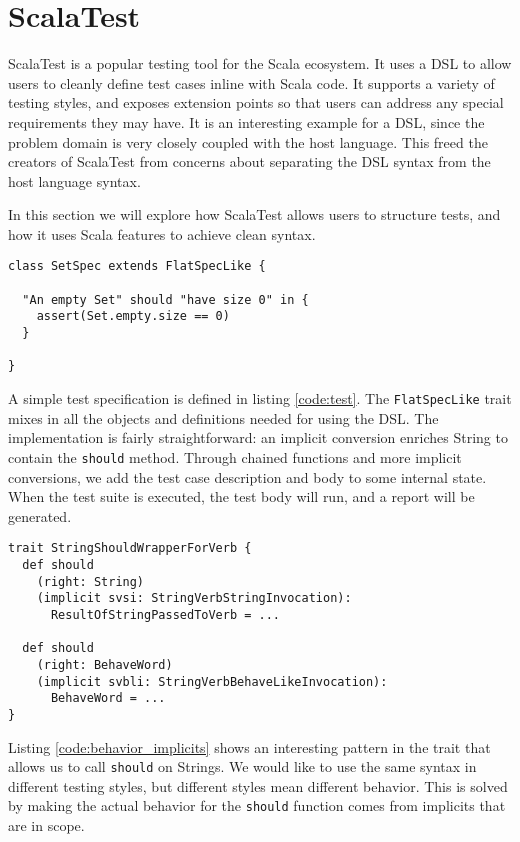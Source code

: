 \section{ScalaTest}

ScalaTest is a popular testing tool for the Scala ecosystem. It uses a DSL to allow users to cleanly define test cases inline with Scala code. It supports a variety of testing styles, and exposes extension points so that users can address any special requirements they may have. It is an interesting example for a DSL, since the problem domain is very closely coupled with the host language. This freed the creators of ScalaTest from concerns about separating the DSL syntax from the host language syntax.

In this section we will explore how ScalaTest allows users to structure tests, and how it uses Scala features to achieve clean syntax.

\begin{lstlisting}[caption=Simple test, label=code:test]
class SetSpec extends FlatSpecLike {

  "An empty Set" should "have size 0" in {
    assert(Set.empty.size == 0)
  }
	
}
\end{lstlisting}

A simple test specification is defined in listing \ref{code:test}. The \texttt{FlatSpecLike} trait mixes in all the objects and definitions needed for using the DSL. The implementation is fairly straightforward: an implicit conversion enriches String to contain the \texttt{should} method. Through chained functions and more implicit conversions, we add the test case description and body to some internal state. When the test suite is executed, the test body will run, and a report will be generated.

\begin{lstlisting}[caption=Behavior from implicits, label=code:behavior_implicits, float]
trait StringShouldWrapperForVerb {
  def should
    (right: String)
    (implicit svsi: StringVerbStringInvocation):
      ResultOfStringPassedToVerb = ...
      
  def should
    (right: BehaveWord)
    (implicit svbli: StringVerbBehaveLikeInvocation):
      BehaveWord = ...
}
\end{lstlisting}

Listing \ref{code:behavior_implicits} shows an interesting pattern in the trait that allows us to call \texttt{should} on Strings. We would like to use the same syntax in different testing styles, but different styles mean different behavior. This is solved by making the actual behavior for the \texttt{should} function comes from implicits that are in scope.

